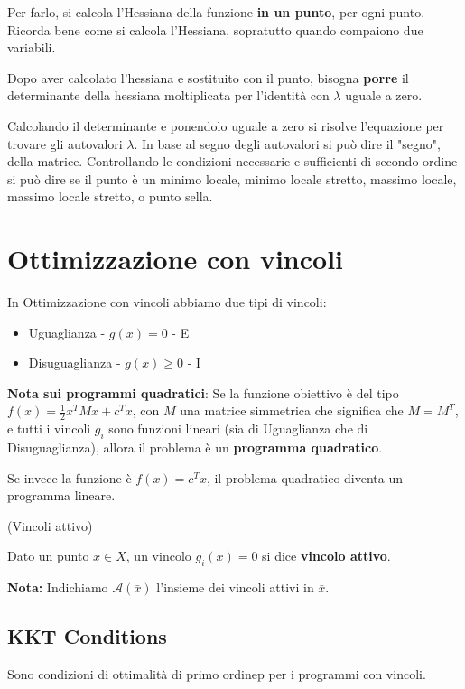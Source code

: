 Per farlo, si calcola l'Hessiana della funzione \textbf{in un punto}, per ogni punto. Ricorda bene 
come si calcola l'Hessiana, sopratutto quando compaiono due variabili.

Dopo aver calcolato l'hessiana e sostituito con il punto, 
bisogna \textbf{porre} il determinante della hessiana moltiplicata per l'identità con $\lambda$ uguale a zero.

Calcolando il determinante e ponendolo uguale a zero si risolve l'equazione per trovare gli autovalori $\lambda$. In base 
al segno degli autovalori si può dire il "segno", della matrice. Controllando le 
condizioni necessarie e sufficienti di secondo ordine si può dire se il punto è un minimo locale, minimo locale stretto, massimo locale, massimo locale stretto, o punto sella.

\section{Ottimizzazione con vincoli}
In Ottimizzazione con vincoli abbiamo due tipi di vincoli:
\begin{itemize}
    \item Uguaglianza - $g(x) = 0$ - E
    \item Disuguaglianza - $g(x) \geq 0$ - I
\end{itemize}

\textbf{Nota sui programmi quadratici}: Se la funzione obiettivo è del tipo $f(x) = \frac{1}{2}x^TMx+c^Tx$, con $M$ una matrice simmetrica
che significa che $M = M^T$, e tutti i vincoli $g_i$ sono funzioni lineari (sia di Uguaglianza che di Disuguaglianza), allora il problema è un \textbf{programma quadratico}.

Se invece la funzione è $f(x) = c^Tx$, il problema quadratico diventa un programma lineare.

\begin{definition}
    (Vincoli attivo)

    Dato un punto $\bar{x} \in X$, un vincolo $g_i(\bar{x}) = 0$ si dice \textbf{vincolo attivo}.
    
    \textbf{Nota:} Indichiamo $\mathcal{A}(\bar{x})$ l'insieme dei vincoli attivi in $\bar{x}$.
\end{definition}

\subsection{KKT Conditions}
Sono condizioni di ottimalità di primo ordinep per i programmi con vincoli. 

